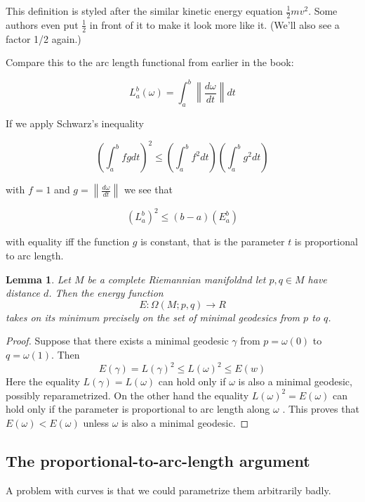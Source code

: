 \documentclass{article}
\newtheorem{lem}{Lemma}
\newtheorem{proof}{Proof}
\newcommand{\Absbars}[1]{\left\lVert#1\right\rVert}
\newcommand{\rmfd}[1]{Riemannian manifold}
\begin{document}
This definition is styled after the similar kinetic energy equation
$\frac{1}{2}mv^2$.  Some authors even put $\frac{1}{2}$ in front of it to make
it look more like it. (We'll also see a factor 1/2 again.)

Compare this to the arc length functional from earlier in the book:

\[
     L_a^b(\omega) = \int_a^b \Absbars{\frac{d\omega}{dt}} dt
\]

If we apply Schwarz's inequality

\[
    \left( \int_a^b fg dt \right)^2
    \leq
    \left( \int_a^b f^2 dt \right)    \left( \int_a^b g^2 dt \right)
\]

with $f = 1$ and $g = \Absbars{\frac{d\omega}{dt}}$ we see that

\[
    \left( L_a^b \right)^2
    \leq
    (b - a)\left( E_a^b \right)
\]

with equality iff the function $g$ is constant, that is the parameter $t$ is
proportional to arc length.

\begin{lem} Let $M$ be a complete \rmfd and let $p,q \in M$ have distance $d$. Then the energy function
    \[
        E: \Omega(M;p,q) \rightarrow R
    \]
    takes on its minimum precisely on the set of minimal geodesics from $p$ to $q$.
\end{lem}


\begin{proof}
    Suppose that there exists a minimal geodesic $\gamma$ from $p = \omega(0)$
    to $q = \omega ( 1 )$. Then
    \[E(\gamma) = L(\gamma)^2 \leq L( \omega )^2 \leq E(w) \]
    Here the equality $L( \gamma ) = L(\omega)$ can hold only if $\omega$ is also a minimal
    geodesic, possibly reparametrized.
    On the other hand the equality $L ( \omega )^2 = E( \omega)$ can hold only if the parameter is proportional
    to arc length along $\omega$ . This proves that $E ( \omega ) < E(\omega)$ unless $\omega$ is also
    a minimal geodesic.
\end{proof}







\subsection{The proportional-to-arc-length argument}

A problem with curves is that we could parametrize them arbitrarily badly.
\end{document}
